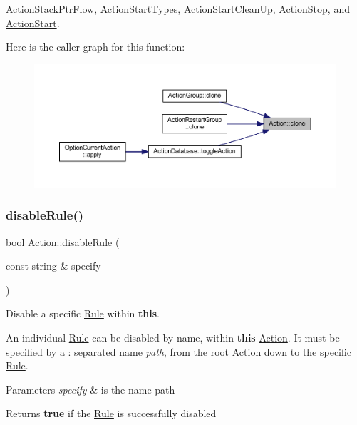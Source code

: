 \mbox{\hyperlink{class_action_stack_ptr_flow_a82a95a85172576abdfa446a3faed3ff4}{Action\+Stack\+Ptr\+Flow}}, \mbox{\hyperlink{class_action_start_types_a6779f5bf6578c6318c2a9cc5d7648d0f}{Action\+Start\+Types}}, \mbox{\hyperlink{class_action_start_clean_up_ad9e7b95a0ee1607e600fad95f78fff93}{Action\+Start\+Clean\+Up}}, \mbox{\hyperlink{class_action_stop_a3b262cbd121ab1595178c1248ca409a3}{Action\+Stop}}, and \mbox{\hyperlink{class_action_start_af8fffe0d933032d6c1e18ef97266d871}{Action\+Start}}.

Here is the caller graph for this function\+:
\nopagebreak
\begin{figure}[H]
\begin{center}
\leavevmode
\includegraphics[width=350pt]{class_action_af8242e41d09e5df52f97df9e65cc626f_icgraph}
\end{center}
\end{figure}
\mbox{\label{class_action_a3409170bddedb8af0b3ac88fabb78642}} 
\subsubsection{\texorpdfstring{disableRule()}{disableRule()}}
{\footnotesize\ttfamily bool Action\+::disable\+Rule (\begin{DoxyParamCaption}\item[{const string \&}]{specify }\end{DoxyParamCaption})}



Disable a specific \mbox{\hyperlink{class_rule}{Rule}} within {\bfseries{this}}. 

An individual \mbox{\hyperlink{class_rule}{Rule}} can be disabled by name, within {\bfseries{this}} \mbox{\hyperlink{class_action}{Action}}. It must be specified by a \textquotesingle{}\+:\textquotesingle{} separated name {\itshape path}, from the root \mbox{\hyperlink{class_action}{Action}} down to the specific \mbox{\hyperlink{class_rule}{Rule}}. 
\begin{DoxyParams}{Parameters}
{\em specify} & is the name path \\
\hline
\end{DoxyParams}
\begin{DoxyReturn}{Returns}
{\bfseries{true}} if the \mbox{\hyperlink{class_rule}{Rule}} is successfully disabled 
\end{DoxyReturn}


